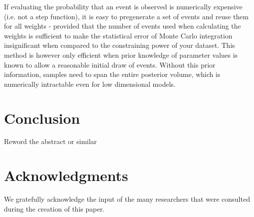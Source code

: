 \documentclass[a4paper,fleqn,usenatbib]{mnras}
\begin{document}
If evaluating the probability that an event is observed is numerically expensive (i.e. not a step function), it is easy to pregenerate a set of events and reuse them for all weights - provided that the number of events used when calculating the weights is sufficient to make the statistical error of Monte Carlo integration insignificant when compared to the constraining power of your dataset. This method is however only efficient when prior knowledge of parameter values is known to allow a reasonable initial draw of events. Without this prior information, samples need to span the entire posterior volume, which is numerically intractable even for low dimensional models.





\section{Conclusion}
\label{sec:conclusion}



Reword the abstract or similar


\section*{Acknowledgments}

We gratefully acknowledge the input of the many researchers that were consulted during the creation of this paper.





\bsp	%
\label{lastpage}
\end{document}
